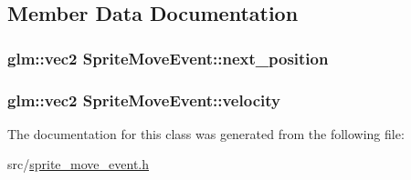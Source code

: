 \subsection{Member Data Documentation}
\hypertarget{class_sprite_move_event_ad78a204593fa7266b54757758930606a}{}
\subsubsection[{next\+\_\+position}]{\setlength{\rightskip}{0pt plus 5cm}glm\+::vec2 Sprite\+Move\+Event\+::next\+\_\+position\hspace{0.3cm}{\ttfamily [private]}}\label{class_sprite_move_event_ad78a204593fa7266b54757758930606a}
\hypertarget{class_sprite_move_event_abf71a5443922204d31f96c14c1bc4dc0}{}
\subsubsection[{velocity}]{\setlength{\rightskip}{0pt plus 5cm}glm\+::vec2 Sprite\+Move\+Event\+::velocity\hspace{0.3cm}{\ttfamily [private]}}\label{class_sprite_move_event_abf71a5443922204d31f96c14c1bc4dc0}


The documentation for this class was generated from the following file\+:\begin{DoxyCompactItemize}
\item 
src/\hyperlink{sprite__move__event_8h}{sprite\+\_\+move\+\_\+event.\+h}\end{DoxyCompactItemize}
